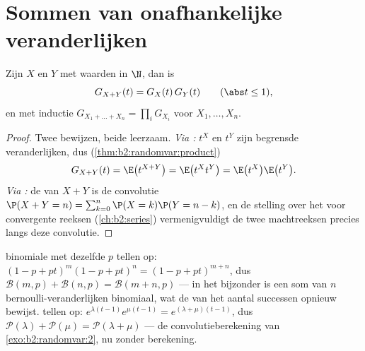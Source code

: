 \section{Sommen van onafhankelijke veranderlijken}

\begin{theorem}[Multiplicativiteit]\label{thm:b2:genfun:product}
Zijn $X$ en $Y$   met waarden in
$\N$, dan is
\[
G_{X + Y}(t) = G_X(t)\,G_Y(t)
\qquad (\abs t \leq 1),
\]
en met inductie $G_{X_1 + \dots + X_n} = \prod_i G_{X_i}$ voor
 $X_1, \dots, X_n$.
\end{theorem}

\begin{proof}
Twee bewijzen, beide leerzaam. \emph{Via :}
$t^X$ en $t^Y$ zijn  begrensde veranderlijken, dus
(\cref{thm:b2:randomvar:product})
\[
G_{X+Y}(t) = \E\bigl(t^{X+Y}\bigr)
= \E\bigl(t^X t^Y\bigr)
= \E\bigl(t^X\bigr)\E\bigl(t^Y\bigr) .
\]
\emph{Via :} de  van $X + Y$ is de
convolutie $\P(X + Y = n) = \sum_{k=0}^n \P(X = k)\P(Y = n - k)$,
en de stelling over het  voor  convergente
reeksen (\cref{ch:b2:series}) vermenigvuldigt de twee machtreeksen
precies langs deze convolutie.
\end{proof}

\begin{example}\label{ex:b2:genfun:stability}
 binomiale  met dezelfde $p$ tellen op:
$(1 - p + pt)^m(1 - p + pt)^n = (1 - p + pt)^{m+n}$, dus
$\mathcal{B}(m, p) + \mathcal{B}(n, p) = \mathcal{B}(m + n, p)$
--- in het bijzonder is een som van $n$ 
bernoulli-veranderlijken binomiaal, wat de  van het aantal
successen opnieuw bewijst.  
tellen op: $e^{\lambda(t-1)}e^{\mu(t-1)} = e^{(\lambda +
\mu)(t-1)}$, dus $\mathcal{P}(\lambda) + \mathcal{P}(\mu) =
\mathcal{P}(\lambda + \mu)$ --- de convolutieberekening van
\cref{exo:b2:randomvar:2}, nu zonder berekening.
\end{example}

